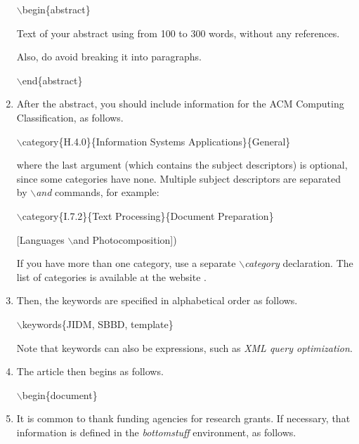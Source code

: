 \documentclass[jidm,a4paper]{jidm} %
\newenvironment{latexcode}
{\ttfamily\vspace{0.1in}\setlength{\parindent}{18pt}}
{\vspace{0.1in}}
\begin{document}
\begin{enumerate}
		\begin{latexcode}		
				$\backslash$begin\{abstract\}
				
Text of your abstract using from 100 to 300 words, without any references. 

Also, do avoid breaking it into paragraphs.
				
				$\backslash$end\{abstract\}
		\end{latexcode}
					
	\item After the abstract, you should include information for the ACM Computing Classification, as follows.
	
	\begin{latexcode}		
				$\backslash$category\{H.4.0\}\{Information Systems Applications\}\{General\}
	\end{latexcode}
	
	where the last argument (which contains the subject descriptors) is optional, since some categories have none. 
	Multiple subject descriptors are separated by $\backslash$\textit{and} commands, for example:  
	\begin{latexcode}
	
	$\backslash$category\{I.7.2\}\{Text Processing\}\{Document Preparation\}
	
	[Languages $\backslash$and Photocomposition])
	\end{latexcode}
	
	If you have more than one category, use a separate $\backslash$\textit{category} declaration. 
	The list of categories is available at the website . \rmfamily

	\item Then, the keywords are specified in alphabetical order as follows.
	
	\begin{latexcode}
		$\backslash$keywords\{JIDM, SBBD, template\}
	\end{latexcode}

	Note that keywords can also be expressions, such as \textit{XML query optimization}.

	\item The article then begins as follows.
	
	\begin{latexcode}
	   $\backslash$begin\{document\}
	\end{latexcode}
	
	\item It is common to thank funding agencies for research grants. If necessary, that information is defined in the \textit{bottomstuff} environment, as follows.
	

\end{enumerate}
\end{document}
